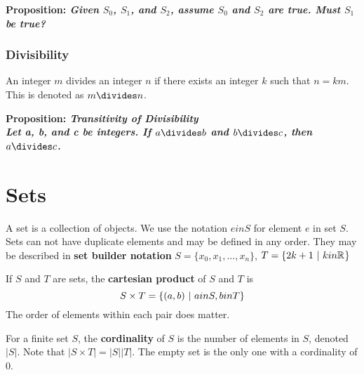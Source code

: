 \documentclass[12pt]{article}
\newcommand{\R}[1]{\mathbb{R}^{#1}}
\newcommand{\proposition}[1]{{\bf Proposition: \textit{#1}}}
\begin{document}
\proposition{Given $S_0$, $S_1$, and $S_2$, assume $S_0$ and $S_2$ are true. Must $S_1$ be true?}


\subsubsection*{Divisibility}
 An integer $m$ divides an integer $n$ if there exists an integer $k$ such that $n = km$. This is denoted as $m \divides n$.

\proposition{Transitivity of Divisibility\\
Let a, b, and c be integers. If $a\divides b$ and $b\divides c$, then $a\divides c$.}


\section*{Sets}
A set is a collection of objects. We use the notation $e in S$ for element $e$ in set $S$. Sets can not have duplicate elements and may be defined in any order. They may be described in {\bf set builder notation} $S = \{ x_0, x_1, ... , x_n \}$, $T = \{ 2k + 1 \suchthat k in \R{} \}$

If $S$ and $T$ are sets, the {\bf cartesian product} of $S$ and $T$ is \[ S \times T = \{ (a,b) \ |\  a in S, b in T \} \] The order of elements within each pair does matter.

For a finite set $S$, the {\bf cordinality} of $S$ is the number of elements in $S$, denoted $|S|$. Note that $|S \times T| = |S||T|$. The empty set is the only one with a cordinality of 0.
\end{document}
